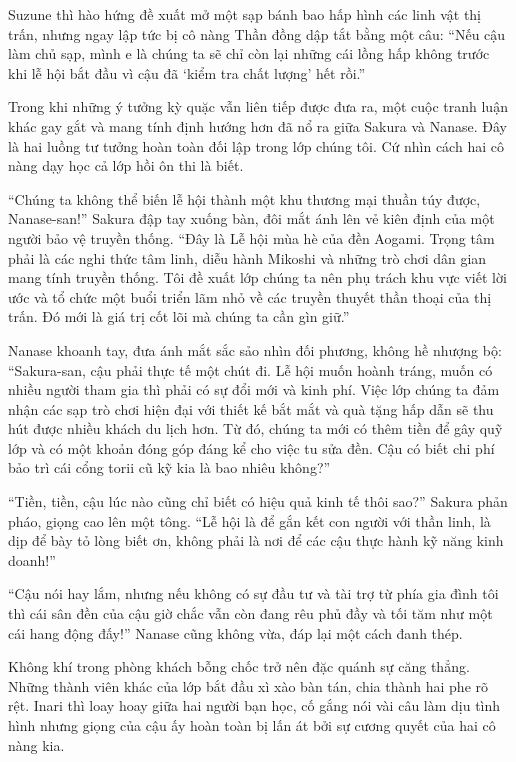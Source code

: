 \documentclass[../main.tex]{subfiles}
\begin{document}
Suzune thì hào hứng đề xuất mở một sạp bánh bao hấp hình các linh vật thị trấn, nhưng ngay lập tức bị cô nàng Thần đồng dập tắt bằng một câu: ``Nếu cậu làm chủ sạp, mình e là chúng ta sẽ chỉ còn lại những cái lồng hấp không trước khi lễ hội bắt đầu vì cậu đã `kiểm tra chất lượng' hết rồi.''

Trong khi những ý tưởng kỳ quặc vẫn liên tiếp được đưa ra, một cuộc tranh luận khác gay gắt và mang tính định hướng hơn đã nổ ra giữa Sakura và Nanase. Đây là hai luồng tư tưởng hoàn toàn đối lập trong lớp chúng tôi. Cứ nhìn cách hai cô nàng dạy học cả lớp hồi ôn thi là biết.

``Chúng ta không thể biến lễ hội thành một khu thương mại thuần túy được, Nanase-san!'' Sakura đập tay xuống bàn, đôi mắt ánh lên vẻ kiên định của một người bảo vệ truyền thống. ``Đây là Lễ hội mùa hè của đền Aogami. Trọng tâm phải là các nghi thức tâm linh, diễu hành Mikoshi và những trò chơi dân gian mang tính truyền thống. Tôi đề xuất lớp chúng ta nên phụ trách khu vực viết lời ước và tổ chức một buổi triển lãm nhỏ về các truyền thuyết thần thoại của thị trấn. Đó mới là giá trị cốt lõi mà chúng ta cần gìn giữ.''

Nanase khoanh tay, đưa ánh mắt sắc sảo nhìn đối phương, không hề nhượng bộ: ``Sakura-san, cậu phải thực tế một chút đi. Lễ hội muốn hoành tráng, muốn có nhiều người tham gia thì phải có sự đổi mới và kinh phí. Việc lớp chúng ta đảm nhận các sạp trò chơi hiện đại với thiết kế bắt mắt và quà tặng hấp dẫn sẽ thu hút được nhiều khách du lịch hơn. Từ đó, chúng ta mới có thêm tiền để gây quỹ lớp và có một khoản đóng góp đáng kể cho việc tu sửa đền. Cậu có biết chi phí bảo trì cái cổng torii cũ kỹ kia là bao nhiêu không?''

``Tiền, tiền, cậu lúc nào cũng chỉ biết có hiệu quả kinh tế thôi sao?'' Sakura phản pháo, giọng cao lên một tông. ``Lễ hội là để gắn kết con người với thần linh, là dịp để bày tỏ lòng biết ơn, không phải là nơi để các cậu thực hành kỹ năng kinh doanh!''

``Cậu nói hay lắm, nhưng nếu không có sự đầu tư và tài trợ từ phía gia đình tôi thì cái sân đền của cậu giờ chắc vẫn còn đang rêu phủ đầy và tối tăm như một cái hang động đấy!'' Nanase cũng không vừa, đáp lại một cách đanh thép.

Không khí trong phòng khách bỗng chốc trở nên đặc quánh sự căng thẳng. Những thành viên khác của lớp bắt đầu xì xào bàn tán, chia thành hai phe rõ rệt. Inari thì loay hoay giữa hai người bạn học, cố gắng nói vài câu làm dịu tình hình nhưng giọng của cậu ấy hoàn toàn bị lấn át bởi sự cương quyết của hai cô nàng kia.
\end{document}
